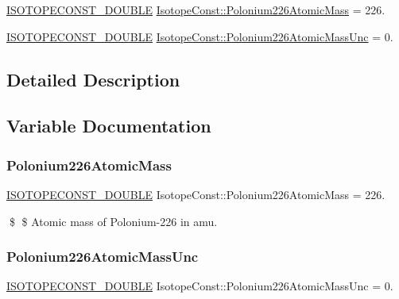 \begin{DoxyCompactItemize}
\item 
\mbox{\hyperlink{group___isotope_const-_macros_ga8f45a7272ce02c0b4c65c44636ed719a}{I\+S\+O\+T\+O\+P\+E\+C\+O\+N\+S\+T\+\_\+\+D\+O\+U\+B\+LE}} \mbox{\hyperlink{group___isotope_const-_polonium-_po226_ga0680129e9253d04d4df940da39c9cf77}{Isotope\+Const\+::\+Polonium226\+Atomic\+Mass}} = 226.
\item 
\mbox{\hyperlink{group___isotope_const-_macros_ga8f45a7272ce02c0b4c65c44636ed719a}{I\+S\+O\+T\+O\+P\+E\+C\+O\+N\+S\+T\+\_\+\+D\+O\+U\+B\+LE}} \mbox{\hyperlink{group___isotope_const-_polonium-_po226_ga435a0dff9977a563670e82f4ae80cabe}{Isotope\+Const\+::\+Polonium226\+Atomic\+Mass\+Unc}} = 0.
\end{DoxyCompactItemize}


\subsection{Detailed Description}


\subsection{Variable Documentation}
\mbox{\label{group___isotope_const-_polonium-_po226_ga0680129e9253d04d4df940da39c9cf77}} 
\subsubsection{\texorpdfstring{Polonium226\+Atomic\+Mass}{Polonium226AtomicMass}}
{\footnotesize\ttfamily \mbox{\hyperlink{group___isotope_const-_macros_ga8f45a7272ce02c0b4c65c44636ed719a}{I\+S\+O\+T\+O\+P\+E\+C\+O\+N\+S\+T\+\_\+\+D\+O\+U\+B\+LE}} Isotope\+Const\+::\+Polonium226\+Atomic\+Mass = 226.}

\$ \$ Atomic mass of Polonium-\/226 in amu. \mbox{\label{group___isotope_const-_polonium-_po226_ga435a0dff9977a563670e82f4ae80cabe}} 
\subsubsection{\texorpdfstring{Polonium226\+Atomic\+Mass\+Unc}{Polonium226AtomicMassUnc}}
{\footnotesize\ttfamily \mbox{\hyperlink{group___isotope_const-_macros_ga8f45a7272ce02c0b4c65c44636ed719a}{I\+S\+O\+T\+O\+P\+E\+C\+O\+N\+S\+T\+\_\+\+D\+O\+U\+B\+LE}} Isotope\+Const\+::\+Polonium226\+Atomic\+Mass\+Unc = 0.}

